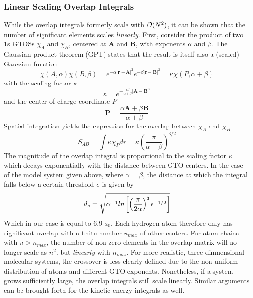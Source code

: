 \subsubsection{Linear Scaling Overlap Integrals}

While the overlap integrals formerly scale with $\mathcal{O}(N^{2})$, it can be shown that the number of significant elements scales \emph{linearly}. First, consider the product of two 1s GTOSs $\chi_{A}$ and $\chi_{B}$, centered at $\mathbf{A}$ and $\mathbf{B}$, with exponents $\alpha$ and $\beta$. The Gaussian product theorem (GPT) states that the result is itself also a (scaled) Gaussian function
\begin{equation}
\chi(A,\alpha) \chi(B,\beta) = e^{-\alpha \left\lvert \mathbf{r} - \mathbf{A} \right\rvert^2} e^{-\beta \left\lvert \mathbf{r} - \mathbf{B} \right\rvert^2} = \kappa \chi(P,\alpha+\beta)  
\end{equation}
\noindent with the scaling factor $\kappa$ 
\begin{equation}
\kappa = e^{-\frac{\alpha\beta}{\alpha+\beta}\left\lvert \mathbf{A} - \mathbf{B} \right\rvert^2}
\end{equation}
\noindent and the center-of-charge coordinate $P$
\begin{equation}
\mathbf{P} = \frac{\alpha \mathbf{A} + \beta \mathbf{B}}{\alpha + \beta}
\end{equation}
\noindent Spatial integration yields the expression for the overlap between $\chi_A$ and $\chi_B$
\begin{equation}
S_{AB} = \int \kappa \chi_{P} dr = \kappa \left(\frac{\pi}{\alpha + \beta}\right)^{3/2}
\end{equation} 
\noindent The magnitude of the overlap integral is proportional to the scaling factor $\kappa$ which decays exponentially with the distance between GTO centers. In the case of the model system given above, where $\alpha = \beta$, the distance at which the integral falls below a certain threshold $\epsilon$ is given by 
\begin{equation}
d_s = \sqrt{\alpha^{-1} ln \left[ \left( \frac{\pi}{2\alpha}\right)^3 \epsilon^{-1/2} \right]}
\end{equation} 
\noindent Which in our case is equal to 6.9 $a_0$. Each hydrogen atom therefore only has significant overlap with a finite number $n_{max}$ of other centers. For atom chains with $n > n_{max}$, the number of non-zero elements in the overlap matrix will no longer scale as $n^2$, but \emph{linearly} with $n_{max}$. For more realistic, three-dimnensional molecular systems, the crossover is less clearly defined due to the non-uniform distribution of atoms and different GTO exponents. Nonetheless, if a system grows sufficiently large, the overlap integrals still scale linearly. Similar arguments can be brought forth for the kinetic-energy integrals as well. 

